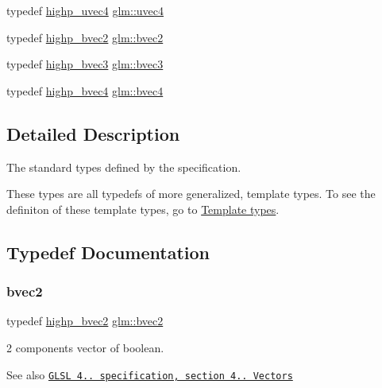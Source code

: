 \begin{DoxyCompactItemize}
\item 
typedef \hyperlink{group__core__precision_ga7cb8cc501f7e680e1889b93eb80e6c46}{highp\+\_\+uvec4} \hyperlink{group__core__types_ga1c426d19627b32b14f0089f7f4ba7b1d}{glm\+::uvec4}
\item 
typedef \hyperlink{group__core__precision_ga4153415d1f3d390219ac9464652ac377}{highp\+\_\+bvec2} \hyperlink{group__core__types_ga7523cf292181cf7daef3aa0a3267d8e3}{glm\+::bvec2}
\item 
typedef \hyperlink{group__core__precision_ga1d77a773fdd024602413670788c10c62}{highp\+\_\+bvec3} \hyperlink{group__core__types_ga3f07d6d37fc6fe875170fd5799685bcf}{glm\+::bvec3}
\item 
typedef \hyperlink{group__core__precision_ga381539af52c5e5c659700e12fb706eaf}{highp\+\_\+bvec4} \hyperlink{group__core__types_ga6bb211b3d3bebae3867548d5673ca5cd}{glm\+::bvec4}
\end{DoxyCompactItemize}


\subsection{Detailed Description}
The standard types defined by the specification. 

These types are all typedefs of more generalized, template types. To see the definiton of these template types, go to \hyperlink{group__core__template}{Template types}. 

\subsection{Typedef Documentation}
\mbox{\label{group__core__types_ga7523cf292181cf7daef3aa0a3267d8e3}} 
\subsubsection{\texorpdfstring{bvec2}{bvec2}}
{\footnotesize\ttfamily typedef \hyperlink{group__core__precision_ga4153415d1f3d390219ac9464652ac377}{highp\+\_\+bvec2} \hyperlink{group__core__types_ga7523cf292181cf7daef3aa0a3267d8e3}{glm\+::bvec2}}

2 components vector of boolean.

\begin{DoxySeeAlso}{See also}
\href{http://www.opengl.org/registry/doc/GLSLangSpec.4.20.8.pdf}{\tt G\+L\+SL 4.. specification, section 4.. Vectors} 
\end{DoxySeeAlso}


